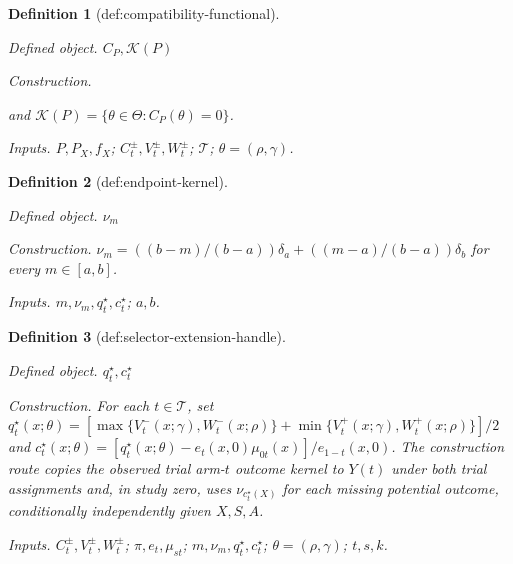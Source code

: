 \documentclass{article}
\newtheorem{definition}{Definition}
\begin{document}
\begin{definition}[def:compatibility-functional]\label{def:compatibility-functional}
\par\smallskip\noindent\emph{Defined object.} \(C_P,\mathcal K(P)\)
\par\smallskip\noindent\emph{Construction.} \par\noindent {}\par\noindent and \(\mathcal K(P)=\{\theta\in\Theta:C_P(\theta)=0\}\).
\par\smallskip\noindent\emph{Inputs.} \(P,P_X,f_X\); \(C_t^\pm,V_t^\pm,W_t^\pm\); \(\mathcal T\); \(\theta=(\rho,\gamma)\).
\end{definition}

\begin{definition}[def:endpoint-kernel]\label{def:endpoint-kernel}
\par\smallskip\noindent\emph{Defined object.} \(\nu_m\)
\par\smallskip\noindent\emph{Construction.} \(\nu_m=((b-m)/(b-a))\delta_a+((m-a)/(b-a))\delta_b\) for every \(m\in[a,b]\).
\par\smallskip\noindent\emph{Inputs.} \(m,\nu_m,q_t^\star,c_t^\star\); \(a,b\).
\end{definition}

\begin{definition}[def:selector-extension-handle]\label{def:selector-extension-handle}
\par\smallskip\noindent\emph{Defined object.} \(q_t^\star,c_t^\star\)
\par\smallskip\noindent\emph{Construction.} For each \(t\in\mathcal T\), set \(q_t^\star(x;\theta)=[\max\{V_t^-(x;\gamma),W_t^-(x;\rho)\}+\min\{V_t^+(x;\gamma),W_t^+(x;\rho)\}]/2\) and \(c_t^\star(x;\theta)=[q_t^\star(x;\theta)-e_t(x,0)\mu_{0t}(x)]/e_{1-t}(x,0)\). The construction route copies the observed trial arm-\(t\) outcome kernel to \(Y(t)\) under both trial assignments and, in study zero, uses \(\nu_{c_t^\star(X)}\) for each missing potential outcome, conditionally independently given \(X,S,A\).
\par\smallskip\noindent\emph{Inputs.} \(C_t^\pm,V_t^\pm,W_t^\pm\); \(\pi,e_t,\mu_{st}\); \(m,\nu_m,q_t^\star,c_t^\star\); \(\theta=(\rho,\gamma)\); \(t,s,k\).
\end{definition}
\end{document}
